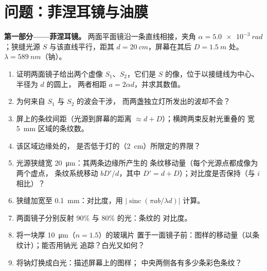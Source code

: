 \section{问题：菲涅耳镜与油膜}

\begin{problem}
\label{pb:b2:two-wave-interference:1}

\medskip
\noindent\textbf{第一部分——菲涅耳镜。}
两面平面镜沿一条直线相接，夹角 $\alpha =
\qty{5.0e-3}{rad}$；狭缝光源 $S$ 与该直线平行，距其 $d =
\qty{20}{cm}$，屏幕在其后 $D = \qty{1.5}{m}$ 处。$\lambda =
\qty{589}{nm}$（钠）。
\begin{enumerate}
  \item 证明两面镜子给出两个虚像 $S_1$、$S_2$，它们是
        $S$ 的像，位于以接缝线为中心、半径为 $d$ 的圆上，
        两者相距 $a = 2\alpha d$，并求其数值。
  \item 为何来自 $S_1$ 与 $S_2$ 的波会干涉，
        而两盏独立灯所发出的波却不会？
  \item 屏上的条纹间距（光源到屏幕的距离
        $\approx d + D$）；横跨两束反射光重叠的
        宽 \qty{5}{mm} 区域的条纹数。
  \item 该区域边缘处的，
        是否低于灯的（\qty{2}{cm}）所限定的界限？
  \item 光源狭缝宽 \qty{20}{\micro m}：其两条边缘所产生的
        条纹移动量（每个光源点都成像为两个虚点，
        条纹系统移动 $bD'/d$，其中 $D' =
        d + D$）；对比度是否保持（与 $i$ 相比）？
  \item 狭缝加宽至 \qty{0.1}{mm}：对比度，用
        $|\operatorname{sinc}(\pi ab/\lambda d)|$ 计算。
  \item 两面镜子分别反射 $90\%$ 与 $80\%$ 的光：条纹的
        对比度。
  \item 将一块厚 \qty{10}{\micro m}（$n = 1.5$）的玻璃片
        置于一面镜子前：图样的移动量（以条纹计）；能否用钠光
        追踪？白光又如何？
  \item 将钠灯换成白光：描述屏幕上的图样；
        中央两侧各有多少条彩色条纹？
\end{enumerate}


\end{problem}
